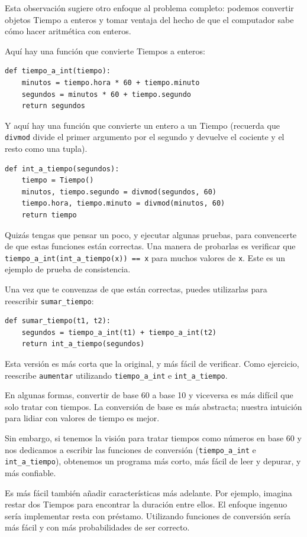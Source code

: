 \documentclass[10pt]{book}
\begin{document}
Esta observación sugiere otro enfoque al problema completo: podemos
convertir objetos Tiempo a enteros y tomar ventaja del hecho de
que el computador sabe cómo hacer aritmética con enteros.

Aquí hay una función que convierte Tiempos a enteros:

\begin{verbatim}
def tiempo_a_int(tiempo):
    minutos = tiempo.hora * 60 + tiempo.minuto
    segundos = minutos * 60 + tiempo.segundo
    return segundos
\end{verbatim}
%
Y aquí hay una función que convierte un entero a un Tiempo
(recuerda que {\tt divmod} divide el primer argumento por el segundo
y devuelve el cociente y el resto como una tupla).

\begin{verbatim}
def int_a_tiempo(segundos):
    tiempo = Tiempo()
    minutos, tiempo.segundo = divmod(segundos, 60)
    tiempo.hora, tiempo.minuto = divmod(minutos, 60)
    return tiempo
\end{verbatim}
%
Quizás tengas que pensar un poco, y ejecutar algunas pruebas, para convencerte
de que estas funciones están correctas.  Una manera de probarlas es
verificar que \verb"tiempo_a_int(int_a_tiempo(x)) == x" para muchos valores de
{\tt x}.  Este es un ejemplo de prueba de consistencia.

Una vez que te convenzas de que están correctas, puedes utilizarlas para
reescribir \verb"sumar_tiempo":

\begin{verbatim}
def sumar_tiempo(t1, t2):
    segundos = tiempo_a_int(t1) + tiempo_a_int(t2)
    return int_a_tiempo(segundos)
\end{verbatim}
%
Esta versión es más corta que la original, y más fácil de verificar.  Como
ejercicio, reescribe {\tt aumentar} utilizando \verb"tiempo_a_int" e
\verb"int_a_tiempo".

En algunas formas, convertir de base 60 a base 10 y viceversa es más difícil
que solo tratar con tiempos.  La conversión de base es más abstracta; nuestra
intuición para lidiar con valores de tiempo es mejor.

Sin embargo, si tenemos la visión para tratar tiempos como números en base 60 y nos
dedicamos a escribir las funciones de conversión (\verb"tiempo_a_int"
e \verb"int_a_tiempo"), obtenemos un programa más corto, más fácil de
leer y depurar, y más confiable.

Es más fácil también añadir características más adelante.  Por ejemplo, imagina
restar dos Tiempos para encontrar la duración entre ellos.  El
enfoque ingenuo sería implementar resta con préstamo.
Utilizando funciones de conversión sería más fácil y con más probabilidades de ser
correcto.
\end{document}
